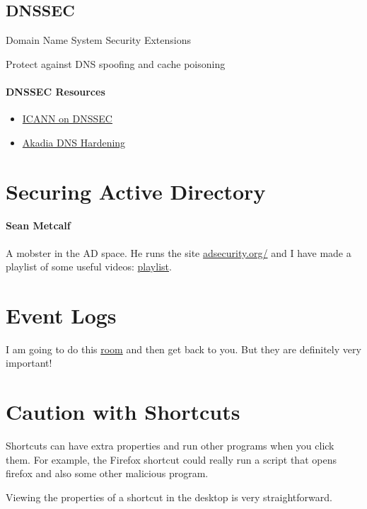 \documentclass{article}
\begin{document}
\subsection{DNSSEC}
Domain Name System Security Extensions

Protect against DNS spoofing and cache poisoning

\paragraph{DNSSEC Resources}
\begin{itemize}
\item \href{https://www.icann.org/resources/pages/dnssec-what-is-it-why-important-2019-03-05-en}{ICANN on DNSSEC}
\item \href{https://www.akadia.com/services/dns_hardening.html}{Akadia DNS Hardening}
\end{itemize}

\section{Securing Active Directory}

\paragraph{Sean Metcalf}
A mobster in the AD space. He runs the site \href{https://adsecurity.org/}{adsecurity.org/}
and I have made a playlist of some useful videos: \href{https://www.youtube.com/playlist?list=PLHkV-wwoQ7s_7vUau-eqiscWoZZNC3EcZ}{playlist}.

\section{Event Logs}
I am going to do this \href{https://tryhackme.com/room/windowseventlogs}{room} and then get back to you.
But they are definitely very important!

\section{Caution with Shortcuts}
Shortcuts can have extra properties and run other programs when you click them.
For example, the Firefox shortcut could really run a script that opens firefox and also some
other malicious program.

\noindent Viewing the properties of a shortcut in the desktop is very straightforward.
\end{document}
